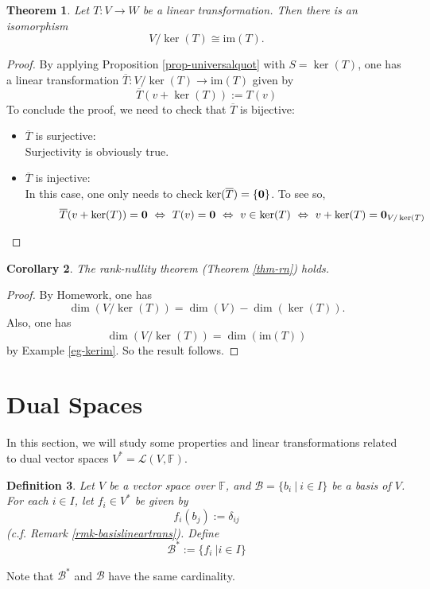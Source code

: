 \documentclass[12pt]{amsbook}
\newtheorem{theorem}{Theorem}[section]
\newtheorem{corollary}[theorem]{Corollary}
\newtheorem{definition}[theorem]{Definition}
\begin{document}
\begin{theorem}
    Let $T: V \to W$ be a linear transformation. Then there is an isomorphism
    $$V/\ker(T) \cong \mathrm{im}(T).$$
\end{theorem}
    \begin{proof}
By applying Proposition \ref{prop-universalquot} with $S = \ker(T)$, one has a linear transformation $ \overline{T} : V/\ker(T) \to \mathrm{im}(T)$ given by $$ \overline{T}(v+\ker(T)):=T(v) $$
    To conclude the proof, we need to check that $\overline{T}$ is bijective:
    \begin{itemize}
        \item{$\overline{T}$ is surjective:} \\
            Surjectivity is obviously true.
        \item{$\overline{T}$ is injective:} \\
            In this case, one only needs to check $\ker(\overline{T}) = \{{\bf 0}\}$. To see so,
            \begin{align*}
            \quad \quad \quad \overline{T}(v+\ker(T)) = {\bf 0}\
            \Leftrightarrow\ T(v) = {\bf 0}\
            \Leftrightarrow\ v \in \ker(T)\ 
            \Leftrightarrow\ v + \ker(T) = {\bf 0}_{V/\ker(T)} \end{align*}
    \end{itemize}        
    \end{proof}

\begin{corollary}
    The rank-nullity theorem (Theorem \ref{thm-rn}) holds.
\end{corollary}    
\begin{proof}
    By Homework, one has $$\dim(V/\ker(T)) = \dim(V) - \dim(\ker(T)).$$ Also, one has $$\dim(V/\ker(T)) = \dim(\mathrm{im}(T))$$ by Example \ref{eg-kerim}. So the result follows.    
\end{proof}


\section{Dual Spaces}
In this section, we will study some properties and linear transformations related to dual vector spaces $V^* = \mathcal{L}(V,\mathbb{F})$. 

\begin{definition}
    Let $V$ be a vector space over $\mathbb{F}$, and $\mathcal{B} = \{b_i\ |\ i \in I\}$ be a basis of $V$. For each $i \in I$, let $f_i \in V^*$ be given by
    $$f_i(b_j) := \delta_{ij}$$
    (c.f. Remark \ref{rmk-basislineartrans}). Define
    $$\mathcal{B}^* := \{f_i\ | i \in I\}$$
\end{definition}
Note that $\mathcal{B}^*$ and $\mathcal{B}$ have the same cardinality.
\end{document}
